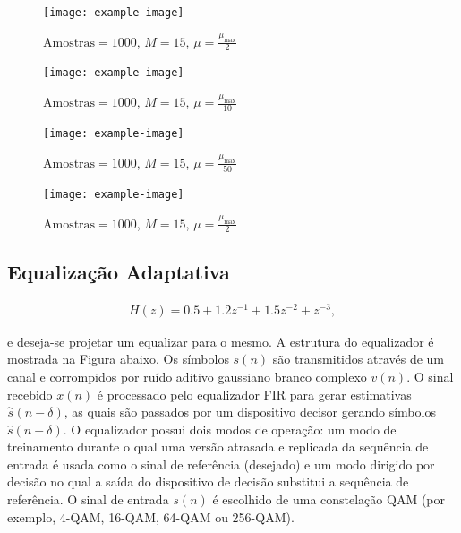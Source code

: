 \begin{figure}[!htp]
    \centering
    \texttt{[image: example-image]}
    \caption{$\text{Amostras} = 1000$, $M = 15$, $\mu = \frac{\mu_{\text{max}}}{2}$}
    \label{fig:filter_response_2}
\end{figure}

\begin{figure}[!htp]
    \centering
    \texttt{[image: example-image]}
    \caption{$\text{Amostras} = 1000$, $M = 15$, $\mu = \frac{\mu_{\text{max}}}{10}$}
    \label{fig:filter_response_10}
\end{figure}

\begin{figure}[!htp]
    \centering
    \texttt{[image: example-image]}
    \caption{$\text{Amostras} = 1000$, $M = 15$, $\mu = \frac{\mu_{\text{max}}}{50}$}
    \label{fig:L3Q5_t}
\end{figure}

\begin{figure}[!htp]
    \centering
    \texttt{[image: example-image]}
    \caption{$\text{Amostras} = 1000$, $M = 15$, $\mu = \frac{\mu_{\text{max}}}{2}$}
    \label{fig:filter_response_50}
\end{figure}


\subsection{Equalização Adaptativa} %

    
\begin{align}
    H(z) = 0.5 + 1.2z^{-1} + 1.5z^{-2} + z^{-3},
\end{align}

e deseja-se projetar um equalizar para o mesmo. A estrutura do equalizador é mostrada na Figura abaixo. Os símbolos $s(n)$ são transmitidos através de um canal e corrompidos por ruído aditivo gaussiano branco complexo $v(n)$. O sinal recebido $x(n)$ é processado pelo equalizador FIR para gerar estimativas $\overset{\sim}{s}(n - \delta)$, as quais são passados por um dispositivo decisor gerando  símbolos $\hat{s}(n - \delta)$. O equalizador possui dois modos de operação: um modo de treinamento durante o qual uma versão atrasada e  replicada da sequência de entrada é usada como o sinal de referência (desejado) e um modo dirigido por decisão no qual a saída do dispositivo de decisão substitui a sequência de referência. O sinal de entrada $s(n)$ é escolhido de uma constelação QAM (por exemplo, 4-QAM, 16-QAM, 64-QAM ou 256-QAM).



